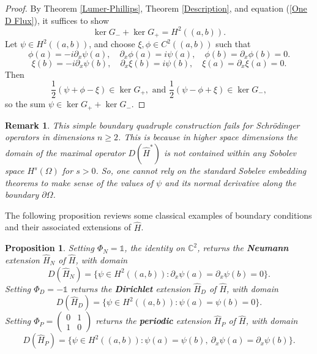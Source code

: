 \documentclass{article}
\numberwithin{equation}{section}
\newtheorem{proposition}{Proposition}[section]
\newtheorem{remark}{Remark}[section]
\begin{document}
\begin{proof}
By Theorem \ref{Lumer-Phillips}, Theorem \ref{Description}, and equation (\ref{One D Flux}), it suffices to show
\begin{equation}
    \ker G_- + \ker G_+= H^2((a,b)).
\end{equation}
Let $\psi \in H^2((a,b))$, and choose $\xi, \phi \in C^2((a,b))$ such that
\begin{equation}
    \phi(a)=-i\partial_x\psi(a), \quad \partial_x \phi(a)=i\psi(a), \quad \phi(b)=\partial_x \phi(b)=0.
\end{equation}
\begin{equation}
    \xi(b)=-i\partial_x\psi(b), \quad \partial_x \xi(b)=i\psi(b), \quad \xi(a)=\partial_x \xi(a)=0.
\end{equation}
Then
\begin{equation}
    \frac{1}{2}(\psi + \phi -\xi)\in \ker G_+, \text{ and } \frac{1}{2}(\psi-\phi +\xi)\in \ker{G_-},
\end{equation}
so the sum $\psi \in \ker G_+ + \ker G_-$.
\end{proof}
\begin{remark}
    This simple boundary quadruple construction fails for Schr\"odinger operators in dimensions $n\geq 2$.  This is because in higher space dimensions the domain of the maximal operator $D(\hat{H}^*)$ is not contained within any Sobolev space $H^s(\Omega)$ for $s>0$. So, one cannot rely on the standard Sobelev embedding theorems to make sense of the values of $\psi$ and its normal derivative along the boundary $\partial \Omega$.
\end{remark}
The following proposition reviews some classical examples of boundary conditions and their associated extensions of $\hat{H}$.
\begin{proposition}
     Setting $\Phi_N= \mathds{1}$, the identity on $\mathbb{C}^2$, returns the \textbf{Neumann} extension $\hat{H}_N$ of $\hat{H}$, with domain
    \begin{equation}
        D(\hat{H}_N)=\{ \psi \in H^2((a,b)): \partial_x \psi (a)=\partial_x \psi(b)=0 \}.
    \end{equation}
     Setting $\Phi_D= -\mathds{1}$ returns the \textbf{Dirichlet} extension $\hat{H}_D$ of $\hat{H}$, with domain
    \begin{equation}
        D(\hat{H}_D)=\{ \psi \in H^2((a,b)): \psi (a)= \psi(b)=0 \}.
    \end{equation}
     Setting $\Phi_P= \begin{pmatrix}
            0 & 1
            \\
            1 & 0
        \end{pmatrix}$ returns the \textbf{periodic} extension $\hat{H}_P$ of $\hat{H}$, with domain 
    \begin{equation} 
        D(\hat{H}_P)=\{ \psi \in H^2((a,b)): \psi (a)= \psi(b), ~\partial_x \psi(a)=\partial_x \psi(b) \}.
    \end{equation}
\end{proposition}
\end{document}
